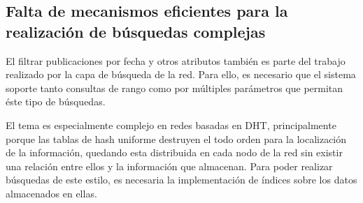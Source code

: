   \subsection{Falta de mecanismos eficientes para la realización de búsquedas complejas}

    El filtrar publicaciones por fecha y otros atributos también es parte del trabajo
    realizado por la capa de búsqueda de la red. Para ello, es
    necesario que el sistema soporte tanto consultas de rango como por
    múltiples parámetros que permitan éste tipo de búsquedas.
    
    El tema es especialmente complejo en redes basadas en DHT, principalmente
    porque las tablas de hash uniforme destruyen el todo orden para la
    localización de la información, quedando esta distribuida en cada nodo de
    la red sin existir una relación entre ellos y la información que almacenan.
    Para poder realizar búsquedas de este estilo, es necesaria la
    implementación de índices sobre los datos almacenados en ellas.

